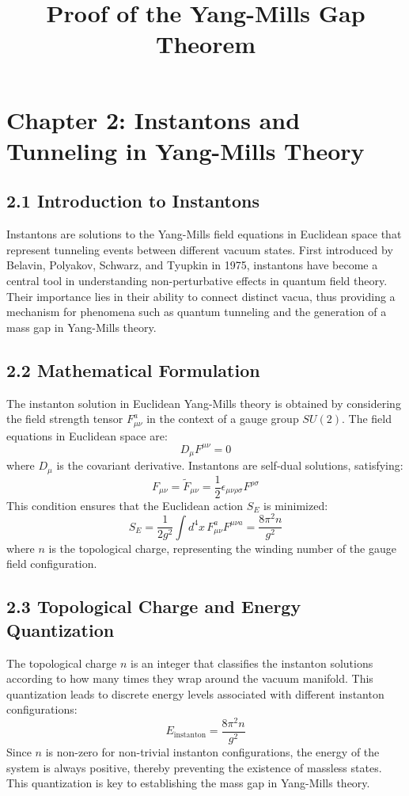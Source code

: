 \documentclass{article}
\title{Proof of the Yang-Mills Gap Theorem}
\author{}
\date{}
\begin{document}
\maketitle

\section*{Chapter 2: Instantons and Tunneling in Yang-Mills Theory}

\subsection*{2.1 Introduction to Instantons}
Instantons are solutions to the Yang-Mills field equations in Euclidean space that represent tunneling events between different vacuum states. First introduced by Belavin, Polyakov, Schwarz, and Tyupkin in 1975, instantons have become a central tool in understanding non-perturbative effects in quantum field theory. Their importance lies in their ability to connect distinct vacua, thus providing a mechanism for phenomena such as quantum tunneling and the generation of a mass gap in Yang-Mills theory.

\subsection*{2.2 Mathematical Formulation}
The instanton solution in Euclidean Yang-Mills theory is obtained by considering the field strength tensor \( F_{\mu\nu}^a \) in the context of a gauge group \( SU(2) \). The field equations in Euclidean space are:
\[
D_\mu F^{\mu\nu} = 0
\]
where \( D_\mu \) is the covariant derivative. Instantons are self-dual solutions, satisfying:
\[
F_{\mu\nu} = \tilde{F}_{\mu\nu} = \frac{1}{2} \epsilon_{\mu\nu\rho\sigma} F^{\rho\sigma}
\]
This condition ensures that the Euclidean action \( S_E \) is minimized:
\[
S_E = \frac{1}{2g^2} \int d^4x \, F_{\mu\nu}^a F^{\mu\nu a} = \frac{8\pi^2 n}{g^2}
\]
where \( n \) is the topological charge, representing the winding number of the gauge field configuration.

\subsection*{2.3 Topological Charge and Energy Quantization}
The topological charge \( n \) is an integer that classifies the instanton solutions according to how many times they wrap around the vacuum manifold. This quantization leads to discrete energy levels associated with different instanton configurations:
\[
E_{\text{instanton}} = \frac{8\pi^2 n}{g^2}
\]
Since \( n \) is non-zero for non-trivial instanton configurations, the energy of the system is always positive, thereby preventing the existence of massless states. This quantization is key to establishing the mass gap in Yang-Mills theory.
\end{document}
